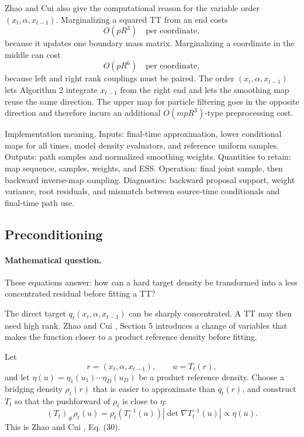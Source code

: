 \documentclass[11pt]{article}
\numberwithin{equation}{section}
\begin{document}
Zhao and Cui \cite{zhao2024ttsequential} also give the computational reason for the variable order
\((x_t,\alpha,x_{t-1})\).  Marginalizing a squared TT from an end costs
\begin{equation}
    O(pR^3)\quad\text{per coordinate},
    \label{eq:p24-b8}
\end{equation}
because it updates one boundary mass matrix.  Marginalizing a coordinate in the
middle can cost
\begin{equation}
    O(pR^6)\quad\text{per coordinate},
    \label{eq:p24-b9}
\end{equation}
because left and right rank couplings must be paired.  The order
\((x_t,\alpha,x_{t-1})\) lets Algorithm 2 integrate \(x_{t-1}\) from the right
end and lets the smoothing map reuse the same direction.  The upper map for
particle filtering goes in the opposite direction and therefore incurs an
additional \(O(mpR^3)\)-type preprocessing cost.

Implementation meaning. Inputs: final-time approximation, lower
conditional maps for all times, model density evaluators, and reference uniform
samples.  Outputs: path samples and normalized smoothing weights.  Quantities
to retain: map sequence, samples, weights, and ESS.  Operation: final joint sample,
then backward inverse-map sampling.  Diagnostics: backward proposal support,
weight variance, root residuals, and mismatch between source-time conditionals
and final-time path use.

\subsection{Preconditioning}

\paragraph{Mathematical question.}
These equations answer: how can a hard target density be transformed into a
less concentrated residual before fitting a TT?

The direct target \(q_t(x_t,\alpha,x_{t-1})\) can be sharply concentrated.  A TT
may then need high rank.  Zhao and Cui \cite{zhao2024ttsequential}, Section 5 introduces a change of variables
that makes the function closer to a product reference density before fitting.

Let
\[
    r=(x_t,\alpha,x_{t-1}),\qquad u=T_t(r),
\]
and let \(\eta(u)=\eta_1(u_1)\cdots\eta_D(u_D)\) be a product reference density.
Choose a bridging density \(\rho_t(r)\) that is easier to approximate than
\(q_t(r)\), and construct \(T_t\) so that the pushforward of \(\rho_t\) is close
to \(\eta\):
\begin{equation}
    (T_t)_\#\rho_t(u)
    =
    \rho_t(T_t^{-1}(u))
    \left|\det\nabla T_t^{-1}(u)\right|
    \propto
    \eta(u).
    \label{eq:p24-p1}
\end{equation}
This is Zhao and Cui \cite{zhao2024ttsequential}, Eq. (30).
\end{document}
